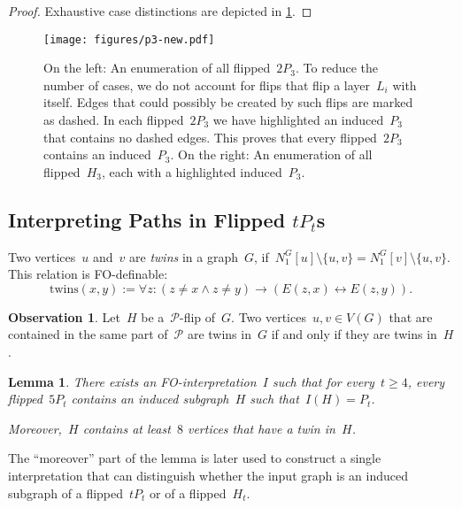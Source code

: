 \documentclass[11pt]{article}      \usepackage[margin=1in]{geometry}  \usepackage{microtype}
\newtheorem{lemma}[theorem]{Lemma}
\theoremstyle{definition}
\newtheorem{observation}[theorem]{Observation}
\newcommand{\twins}{\mathrm{twins}}
\newcommand{\PP}{\mathcal{P}}
\renewcommand{\ge}{\geqslant}
\renewcommand{\geq}{\ge}
\begin{document}
\begin{proof}
    Exhaustive case distinctions are depicted in \cref{fig:p3}.
\end{proof}

\begin{figure}[htbp]
    \centering
    \texttt{[image: figures/p3-new.pdf]}
    \caption{On the left: An enumeration of all flipped~$2P_3$.
    To reduce the number of cases, we do not account for flips that flip a layer~$L_i$ with itself. Edges that could possibly be created by such flips are marked as dashed.
    In each flipped~$2P_3$ we have highlighted an induced~$P_3$ that contains no dashed edges.
    This proves that every flipped~$2P_3$ contains an induced~$P_3$.
    On the right: An enumeration of all flipped~$H_3$, each with a highlighted induced~$P_3$.
    }
    \label{fig:p3}
\end{figure}


\subsection{Interpreting Paths in Flipped \texorpdfstring{$tP_t$s}{tPts}}


Two vertices~$u$ and~$v$ are \emph{twins} in a graph~$G$, if~$N^G_1[u]\setminus \{ u,v \} = N^G_1[v]\setminus \{ u,v \}$.
This relation is FO-definable:
\[
    \twins(x,y) := \forall z : (z \neq x \wedge z \neq y) \rightarrow (E(z,x) \leftrightarrow E(z,y)).
\]

\begin{observation}\label{obs:twin-flip}
    Let~$H$ be a~$\PP$-flip of~$G$. Two vertices~$u,v \in V(G)$ that are contained in the same part of~$\PP$ are twins in~$G$ if and only if they are twins in~$H$.
\end{observation}





\begin{lemma}\label{lem:paths-from-swimlanes}
    There exists an FO-interpretation~$I$ such that for every~$t\geq 4$, every flipped~$5P_t$ contains an induced subgraph~$H$ such that~$I(H)= P_t$.

    \smallskip\noindent
    Moreover,~$H$ contains at least~$8$ vertices that have a twin in~$H$.
\end{lemma}

The ``moreover'' part of the lemma is later used to construct a single interpretation that can distinguish whether the input graph is an induced subgraph of a flipped~$tP_t$ or of a flipped~$H_t$.
\end{document}
